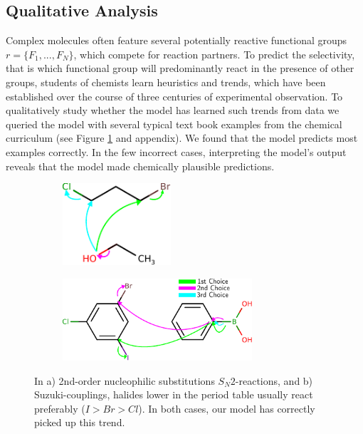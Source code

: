 
\subsection{Qualitative Analysis}

Complex molecules often feature several potentially reactive functional groups $r=\{F_1,...,F_N\}$, which compete for reaction partners. 
To predict the selectivity, that is which functional group will predominantly react in the presence of other groups, 
students of chemists learn heuristics and trends, 
which have been established over the course of three centuries of experimental observation.
To qualitatively study whether the model has learned such trends from data we queried the model with several typical text book examples from the chemical curriculum (see Figure \ref{fig:qualitative} and appendix). 
We found that the model predicts most examples correctly. In the few incorrect cases, interpreting the model's output reveals that the model made chemically plausible predictions.


\begin{figure}[h]

    \centering
    \begin{subfigure}[b]{0.4\textwidth}
        \centering
        \includegraphics[height=1.2in]{imgs/textbook/reaction3}
    \end{subfigure}%
     \begin{subfigure}[b]{0.6\textwidth}
        \centering
        \includegraphics[height=1.2in]{imgs/textbook/reaction7}
    \end{subfigure}
	\caption{In a) 2nd-order nucleophilic substitutions $S_N 2$-reactions, and b) Suzuki-couplings, halides lower in the period table usually react preferably ($I>Br>Cl$). In both cases, our model has correctly picked up this trend.}
	\label{fig:qualitative}
\end{figure}


